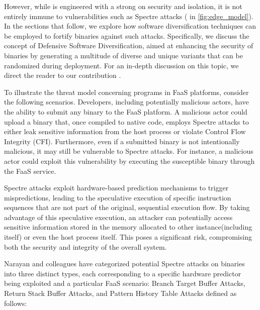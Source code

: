 However, while \Wasm is engineered with a strong on security and isolation, it is not entirely immune to vulnerabilities such as Spectre attacks \cite{Spectre,Narayan2021Swivel} ( in \autoref{fig:edge_model}). 
In the sections that follow, we explore how software diversification techniques can be employed to fortify \Wasm binaries against such attacks. 
Specifically, we discuss the concept of Defensive Software Diversification, aimed at enhancing the security of \Wasm binaries by generating a multitude of diverse and unique \Wasm variants that can be randomized during deployment.
For an in-depth discussion on this topic, we direct the reader to our contribution \cite{wasmmutate}.


To illustrate the threat model concerning \Wasm programs in FaaS platforms, consider the following scenarios. 
Developers, including potentially malicious actors, have the ability to submit any \Wasm binary to the FaaS platform. 
A malicious actor could upload a \Wasm binary that, once compiled to native code, employs Spectre attacks to either leak sensitive information from the host process or violate Control Flow Integrity (CFI).
Furthermore, even if a submitted \Wasm binary is not intentionally malicious, it may still be vulnerable to Spectre attacks. 
For instance, a malicious actor could exploit this vulnerability by executing the susceptible binary through the FaaS service. 

Spectre attacks exploit hardware-based prediction mechanisms to trigger mispredictions, leading to the speculative execution of specific instruction sequences that are not part of the original, sequential execution flow. 
By taking advantage of this speculative execution, an attacker can potentially access sensitive information stored in the memory allocated to other \Wasm instance(including itself) or even the host process itself. 
This poses a significant risk, compromising both the security and integrity of the overall system.

Narayan and colleagues \cite{Narayan2021Swivel} have categorized potential Spectre attacks on \wasm binaries into three distinct types, each corresponding to a specific hardware predictor being exploited and a particular FaaS scenario: Branch Target Buffer Attacks,  Return Stack Buffer Attacks, and Pattern History Table Attacks defined as follows:

